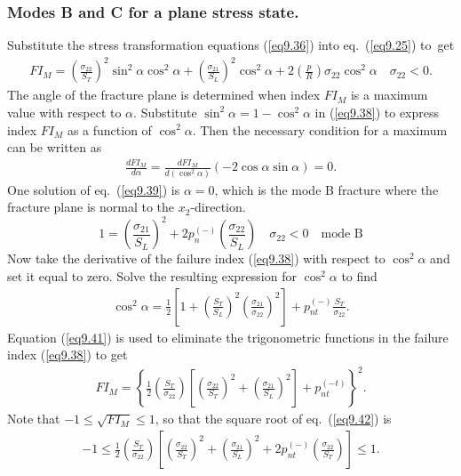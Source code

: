 \documentclass{AeroStructure-ERJohnson}
\begin{document}
\subsubsection{Modes B and C for a plane stress state.} Substitute the stress transformation equations (\ref{eq9.36}) into eq.~(\ref{eq9.25}) to~get
\begin{align}\label{eq9.38}
F I_{M}=\left(\frac{\sigma_{22}}{S_{T}}\right)^{2} \sin ^{2} \alpha \cos ^{2} \alpha+\left(\frac{\sigma_{21}}{S_{L}}\right)^{2} \cos ^{2} \alpha+2\left(\frac{p}{R}\right) \sigma_{22} \cos ^{2} \alpha \quad \sigma_{22}<0.
\end{align}
The angle of the fracture plane is determined when index $\textit{FI}_M$ is a maximum value with respect to $\alpha$. Substitute $\sin ^{2} \alpha=1-\cos ^{2} \alpha$ in (\ref{eq9.38}) to express index $F I_{M}$ as a function of $\cos ^{2} \alpha$. Then the necessary condition for a maximum can be written as
\begin{align}\label{eq9.39}
\frac{d F I_{M}}{d \alpha}=\frac{d F I_{M}}{d\left(\cos ^{2} \alpha\right)}(-2 \cos \alpha \sin \alpha)=0.
\end{align}
One solution of eq.~(\ref{eq9.39}) is $\alpha=0$, which is the mode B fracture where the fracture plane is normal to the $x_2$-direction.
\begin{equation}
1=\left(\frac{\sigma_{21}}{S_{L}}\right)^{2}+2 p_{n}^{(-)}\left(\frac{\sigma_{22}}{S_{L}}\right) \quad \sigma_{22}<0 \quad \text {mode B} \label{eq9.40}
\end{equation}
Now take the derivative of the failure index (\ref{eq9.38}) with respect to $\cos^{2} \alpha$ and set it equal to zero. Solve the resulting expression for $\cos^{2} \alpha$ to find
\begin{align}\label{eq9.41}
\cos ^{2} \alpha=\frac{1}{2}\left[1+\left(\frac{S_{T}}{S_{L}}\right)^{2}\left(\frac{\sigma_{21}}{\sigma_{22}}\right)^{2}\right]+p_{n t}^{(-)} \frac{S_{T}}{\sigma_{22}}.
\end{align}
Equation (\ref{eq9.41}) is used to eliminate the trigonometric functions in the failure index (\ref{eq9.38}) to get
\begin{align}\label{eq9.42}
F I_{M}=\left\{\frac{1}{2}\left(\frac{S_{T}}{\sigma_{22}}\right)\left[\left(\frac{\sigma_{22}}{S_{T}}\right)^{2}+\left(\frac{\sigma_{21}}{S_{L}}\right)^{2}\right]+p_{n t}^{(-t)}\right\}^{2}.
\end{align}
Note that $-1 \leq \sqrt{F I_{M}} \leq 1$, so that the square root of eq.~(\ref{eq9.42}) is
\begin{align}\label{eq9.43}
-1 \leq \frac{1}{2}\left(\frac{S_{T}}{\sigma_{22}}\right)\left[\left(\frac{\sigma_{22}}{S_{T}}\right)^{2}+\left(\frac{\sigma_{21}}{S_{L}}\right)^{2}+2 p_{n t}^{(-)}\left(\frac{\sigma_{22}}{S_{T}}\right)\right] \leq 1.
\end{align}
\end{document}
